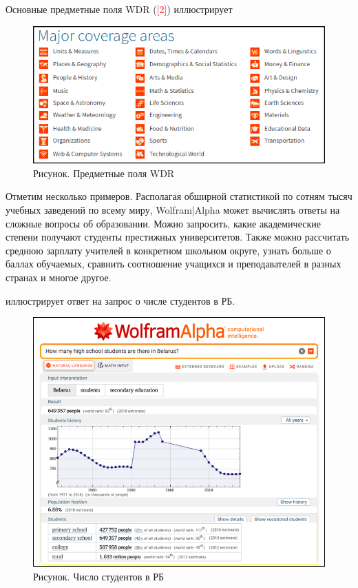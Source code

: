 Основные предметные поля WDR (\textcolor{red}{[2]}) иллюстрирует \textit{} 
\begin{figure}[H]
	\includegraphics[scale=0.9]{images/part7/chapter_integration/integr_alg1.png}
	\caption{Рисунок. Предметные поля WDR}
	\label{fig:integr_alg1}
\end{figure}


Отметим несколько примеров. Располагая обширной статистикой по сотням тысяч учебных заведений по всему миру, Wolfram|Alpha может вычислять ответы на сложные вопросы об образовании.
Можно запросить, какие академические степени получают студенты престижных университетов. 
Также можно рассчитать среднюю зарплату учителей в конкретном школьном округе, узнать больше о баллах обучаемых, сравнить соотношение учащихся и преподавателей в разных странах и многое другое.

\textit{} иллюстрирует ответ на запрос о числе студентов в РБ. 
\begin{figure}[H]
	\includegraphics[scale=0.7]{images/part7/chapter_integration/integr_alg2.png}
	\caption{Рисунок. Число студентов в РБ}
	\label{fig:integr_alg2}
\end{figure}

